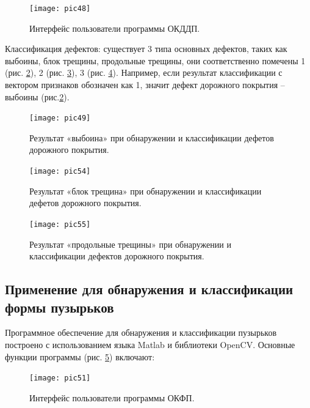 \documentclass[a4paper,14pt]{extreport}
\begin{document}
\begin{figure}[ht!]
\centering
\texttt{[image: pic48]}
\caption{Интерфейс пользователи программы ОКДДП.}
	\label{pic48}
		\end{figure}
		
Классификация дефектов: существует 3 типа основных дефектов, таких как выбоины, блок трещины, продольные трещины, они соответственно помечены 1 (рис. \ref{pic49}), 2 (рис. \ref{pic54}), 3 (рис. \ref{pic55}). Например, если результат классификации с вектором признаков обозначен как 1, значит дефект дорожного покрытия – выбоины (рис.\ref{pic49}).  

\begin{figure}[ht!]
\centering
\texttt{[image: pic49]}
\caption{Результат «выбоина» при обнаружении и классификации дефетов дорожного покрытия.}
	\label{pic49}
		\end{figure}
		
\begin{figure}[ht!]
\centering
\texttt{[image: pic54]}
\caption{Результат «блок трещина» при обнаружении и классификации дефетов дорожного покрытия.}
	\label{pic54}
		\end{figure}
		
\begin{figure}[ht!]
\centering
\texttt{[image: pic55]}
\caption{Результат «продольные трещины» при обнаружении и классификации дефектов дорожного покрытия.}
	\label{pic55}
		\end{figure}

\subsection{Применение для обнаружения и классификации формы пузырьков}
Программное обеспечение для обнаружения и классификации пузырьков построено с использованием языка Matlab и библиотеки OpenCV.
Основные функции программы (рис. \ref{pic51}) включают:

\begin{figure}[ht!]
\centering
\texttt{[image: pic51]}
\caption{Интерфейс пользователи программы ОКФП.}
	\label{pic51}
		\end{figure}
		
\end{document}
